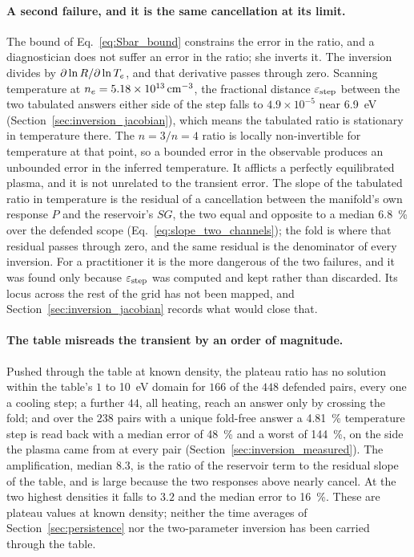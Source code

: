 \paragraph{A second failure, and it is the same cancellation at its limit.} The bound of
Eq.~\eqref{eq:Sbar_bound} constrains the error in the ratio, and a
diagnostician does not suffer an error in the ratio; she inverts it. The
inversion divides by $\partial\ln R/\partial\ln T_e$, and that derivative
passes through zero. Scanning temperature at
$n_e = \SI{5.18e13}{\per\cubic\centi\metre}$, the fractional distance
$\varepsilon_{\mathrm{step}}$ between the two tabulated answers either side of the step falls to
$4.9\times10^{-5}$ near \SI{6.9}{\electronvolt}
(Section~\ref{sec:inversion_jacobian}), which means the tabulated ratio is
stationary in temperature there. The $n=3/n=4$ ratio is locally non-invertible
for temperature at that point, so a bounded error in the observable produces an
unbounded error in the inferred temperature. It afflicts a perfectly
equilibrated plasma, and it is not unrelated to the transient error. The slope
of the tabulated ratio in temperature is the residual of a cancellation between
the manifold's own response $P$ and the reservoir's $SG$, the two
equal and opposite to a median \SI{6.8}{\percent} over the defended scope
(Eq.~\eqref{eq:slope_two_channels}); the fold is where that residual passes
through zero, and the same residual is the denominator of every inversion. For a practitioner
it is the more dangerous of the two failures, and it was found only because
$\varepsilon_{\mathrm{step}}$ was computed and kept rather than discarded. Its locus across the
rest of the grid has not been mapped, and Section~\ref{sec:inversion_jacobian}
records what would close that.

\paragraph{The table misreads the transient by an order of magnitude.} Pushed
through the table at known density, the plateau ratio has no solution within
the table's $1$ to \SI{10}{\electronvolt} domain for $166$ of the $448$
defended pairs, every one a cooling step; a further $44$, all heating, reach an
answer only by crossing the fold; and over
the $238$ pairs with a unique fold-free answer a \SI{4.81}{\percent}
temperature step is read back with a median error of \SI{48}{\percent} and a
worst of \SI{144}{\percent}, on the side the plasma came from at every pair
(Section~\ref{sec:inversion_measured}). The amplification, median $8.3$, is the
ratio of the reservoir term to the residual slope of the table, and is large
because the two responses above nearly cancel. At the two highest densities it
falls to
$3.2$ and the median error to \SI{16}{\percent}. These are plateau values at
known density; neither the time averages of Section~\ref{sec:persistence} nor
the two-parameter inversion has been carried through the table.

